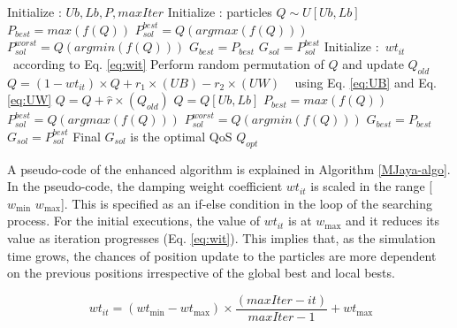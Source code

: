 \documentclass[3p,twocolumn]{elsarticle}
\theoremstyle{thmstyleone}%
\theoremstyle{thmstyletwo}%
\theoremstyle{thmstylethree}%
\begin{document}
\begin{algorithm}
	\caption{Proposed MJaya Optimization Algorithm}
	\label{MJaya-algo}
	\begin{algorithmic}[1]
		\newline
		Initialize : \(Ub,Lb,P,maxIter\) 
		\newline
		Initialize : particles \(Q \sim U[Ub,Lb]\) 
		\newline
		\(P_{best}=max(f(Q))\) 
		\newline
		\(P_{sol}^{best}=Q(arg max(f(Q)))\) 
		\newline
		\(P_{sol}^{worst}=Q(arg min(f(Q)))\) 
		\newline
		\(G_{best}=P_{best}\) 
		\newline
		\(G_{sol}=P_{sol}^{best}\) 	
		\newline
		Initialize :~\(wt_{it}\)~according to Eq. \ref{eq:wit}
		\newline
		Perform random permutation of $Q$ and update $Q_{old}$
		\State \(Q= (1-wt_{it}) \times Q + r_1 \times (UB) - r_2 \times  (UW)\) ~ using Eq. \ref{eq:UB} and  Eq. \ref{eq:UW}
		\Else
		\State \(Q= Q + \hat{r} \times (Q_{old})
		\)			\EndIf
		\State \(Q= {Q} [Ub,Lb]\) 
		\State \(P_{best}=max(f(Q))\) 
		\State \(P_{sol}^{best}=Q(arg max(f(Q)))\) 
		\State \(P_{sol}^{worst}=Q(arg min(f(Q)))\) 
		\State \(G_{best}=P_{best}\) 
		\State \(G_{sol}=P_{sol}^{best}\) 
		\EndIf
		\EndFor
		\newline
		Final \(G_{sol}\) is the optimal QoS \(Q_{opt}\)
		\EndProcedure
	\end{algorithmic}
\end{algorithm}

A pseudo-code of the enhanced algorithm is explained in Algorithm \ref{MJaya-algo}. In the pseudo-code, the damping weight coefficient $wt_{it}$ is scaled in the range [$w_{\mathrm{min}}$ $w_{\mathrm{max}}$]. This is specified as an if-else condition in the loop of the searching process. For the initial executions, the value of $wt_{it}$ is at $w_{\mathrm{max}}$ and it reduces its value as iteration progresses (Eq. \ref{eq:wit}). This implies that, as the simulation time grows, the chances of position update to the particles are more dependent on the previous positions irrespective of the global best and local bests. 

\begin{equation} \label{eq:wit} 
\ wt_{it}= (wt_{\mathrm{min}}-wt_{\mathrm{max}}) \times \frac{(maxIter-it)}{maxIter-1} + wt_{\mathrm{max}}
\end{equation}
\end{document}
